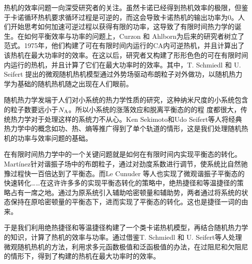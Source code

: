 
\begin{cabstract}
热机的效率问题一向深受研究者的关注。虽然卡诺已经得到热机效率的极限，但鉴于卡诺循环热机要求循环过程是可逆的，而这会导致卡诺热机的输出功率为0。人们开始思考如何加速可逆过程以获得有限的功率，这导致了有限时间热力学的诞生。在如何平衡效率与功率的问题上，Curzon 和 Ahlborn为后来的研究者树立了范式。1975年，他们构建了可在有限时间内运行的CA内可逆热机，并且计算出了该热机在最大功率时的效率。在这以后，研究者又构建了形形色色的可在有限时间内运行的热机，并且计算了它们在最大功率时的效率。其中，T. Schmiedl 和 U. Seifert 提出的微观随机热机模型通过外势场驱动布朗粒子对外做功，以随机热力学为基础的随机热机随之出现在人们眼前。

随机热力学发端于人们对小系统的热力学性质的研究，这种纳米尺度的小系统包含的粒子数要远小于$N_{\mathrm{A}}$。所以小系统的涨落效应和脱离平衡态的的程
度都很大，传统热力学对于处理这样的系统力不从心。Ken Sekimoto和Udo Seifert等人将经典热力学中的概念如功、热、熵等推广得到了单个轨道的情形，这是我们处理随机热机的功率与效率问题的基础。

在有限时间热力学中的一个关键问题就是如何在有限时间内实现平衡态的转化。Martínez针对谐振子场中的布朗粒子，通过对劲度系数进行调节，使系统比自然驰豫过程快一百倍达到了平衡态。而Le Cunuder 等人也实现了微观谐振子平衡态的快速转化……在这许许多多的实现平衡态转化的策略中，绝热捷径和等温捷径的策略占有一席之地。通过为原系统引入辅助哈密顿量和辅助势，两者通过将系统的状态保持在原哈密顿量的平衡态下，进而实现了平衡态的转化。这也是捷径一词的由来。

于是我们利用绝热捷径和等温捷径构建了一个类卡诺热机模型，再结合随机热力学的知识，计算了热机的效率与功率。通过借鉴T. Schmiedl 和 U. Seifert等人处理微观随机热机的方法，利用求多元函数极值和泛函极值的办法，在过阻尼和欠阻尼的情形下，得到了构建的热机在最大功率时的效率。
\end{cabstract}

